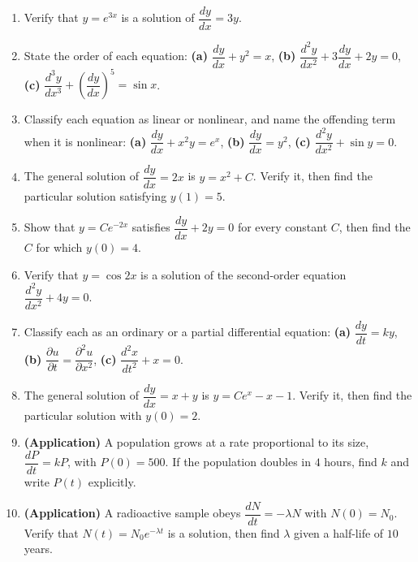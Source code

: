 \documentclass[11pt]{article}
\begin{document}
\begin{enumerate}[leftmargin=2em]
    \item Verify that $y = e^{3x}$ is a solution of $\dfrac{dy}{dx} = 3y$.

    \item State the order of each equation:
          \textbf{(a)} $\dfrac{dy}{dx} + y^{2} = x$, \quad
          \textbf{(b)} $\dfrac{d^{2}y}{dx^{2}} + 3\dfrac{dy}{dx} + 2y = 0$, \quad
          \textbf{(c)} $\dfrac{d^{3}y}{dx^{3}} + \left(\dfrac{dy}{dx}\right)^{5} = \sin x$.

    \item Classify each equation as linear or nonlinear, and name the offending
          term when it is nonlinear:
          \textbf{(a)} $\dfrac{dy}{dx} + x^{2}y = e^{x}$, \quad
          \textbf{(b)} $\dfrac{dy}{dx} = y^{2}$, \quad
          \textbf{(c)} $\dfrac{d^{2}y}{dx^{2}} + \sin y = 0$.

    \item The general solution of $\dfrac{dy}{dx} = 2x$ is $y = x^{2} + C$.
          Verify it, then find the particular solution satisfying $y(1) = 5$.

    \item Show that $y = Ce^{-2x}$ satisfies $\dfrac{dy}{dx} + 2y = 0$ for every
          constant $C$, then find the $C$ for which $y(0) = 4$.

    \item Verify that $y = \cos 2x$ is a solution of the second-order equation
          $\dfrac{d^{2}y}{dx^{2}} + 4y = 0$.

    \item Classify each as an ordinary or a partial differential equation:
          \textbf{(a)} $\dfrac{dy}{dt} = ky$, \quad
          \textbf{(b)} $\dfrac{\partial u}{\partial t} = \dfrac{\partial^{2}u}{\partial x^{2}}$, \quad
          \textbf{(c)} $\dfrac{d^{2}x}{dt^{2}} + x = 0$.

    \item The general solution of $\dfrac{dy}{dx} = x + y$ is
          $y = Ce^{x} - x - 1$. Verify it, then find the particular solution
          with $y(0) = 2$.

    \item \textbf{(Application)} A population grows at a rate proportional to its
          size, $\dfrac{dP}{dt} = kP$, with $P(0) = 500$. If the population
          doubles in $4$ hours, find $k$ and write $P(t)$ explicitly.

    \item \textbf{(Application)} A radioactive sample obeys
          $\dfrac{dN}{dt} = -\lambda N$ with $N(0) = N_{0}$. Verify that
          $N(t) = N_{0}e^{-\lambda t}$ is a solution, then find $\lambda$ given
          a half-life of $10$ years.
\end{enumerate}
\end{document}
